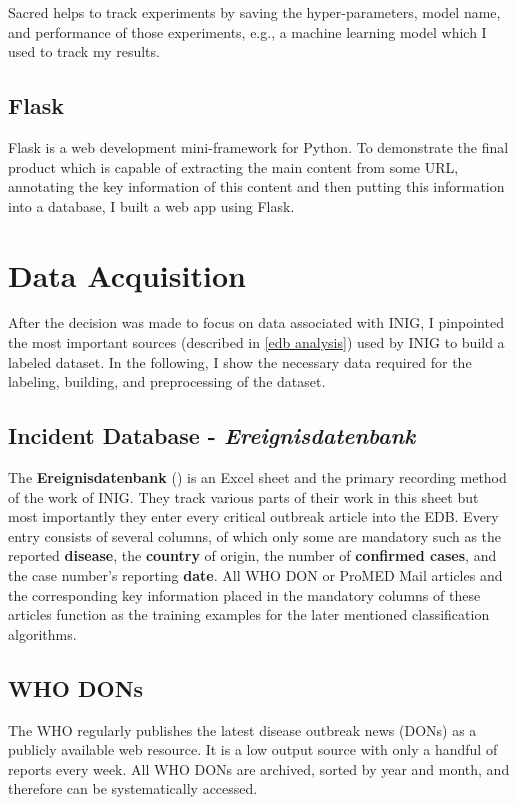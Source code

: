   Sacred helps to track experiments by saving the hyper-parameters, model name, and performance of those experiments, e.g., a machine learning model which I used to track my results.

\subsection{Flask}
  Flask is a web development mini-framework for Python.
  To demonstrate the final product which is capable of extracting the main content from some URL, annotating the key information of this content and then putting this information into a database, I built a web app using Flask.

\section{Data Acquisition}
  After the decision was made to focus on data associated with INIG, I pinpointed the most important sources (described in \ref{edb analysis}) used by INIG to build a labeled dataset.
  In the following, I show the necessary data required for the labeling, building, and preprocessing of the dataset.

\subsection{Incident Database - \textit{Ereignisdatenbank}}
  The \textbf{Ereignisdatenbank} () is an Excel sheet and the primary recording method of the work of INIG.
  They track various parts of their work in this sheet but most importantly they enter every critical outbreak article into the EDB.
  Every entry consists of several columns, of which only some are mandatory such as the reported \textbf{disease}, the \textbf{country} of origin, the number of \textbf{confirmed cases}, and the case number's reporting \textbf{date}.
  All WHO DON or ProMED Mail articles and the corresponding key information placed in the mandatory columns of these articles function as the training examples for the later mentioned classification algorithms.

\subsection{WHO DONs}
  The WHO regularly publishes the latest disease outbreak news (DONs) as a publicly available web resource.
  It is a low output source with only a handful of reports every week.
  All WHO DONs are archived, sorted by year and month, and therefore can be systematically accessed.

